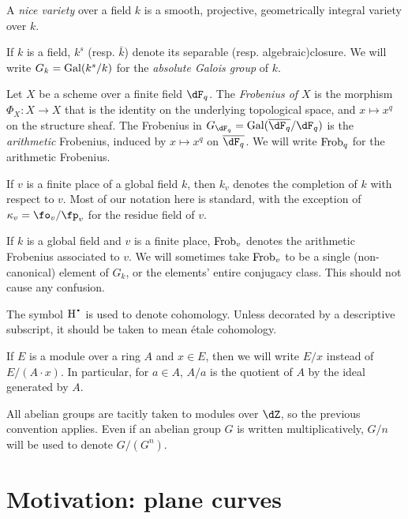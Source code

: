 \documentclass{article}
\begin{document}
A \emph{nice variety} over a field $k$ is a smooth, projective, geometrically 
integral variety over $k$. 

If $k$ is a field, $k^s$ (resp. $\bar k$) denote its separable (resp. 
algebraic)closure. We will write $G_k = \operatorname{Gal}(k^s/k)$ for the \emph{absolute 
Galois group} of $k$. 


Let $X$ be a scheme over a finite field $\dF_q$. The \emph{Frobenius of $X$} 
is the morphism $\Phi_X:X\to X$ that is the identity on the underlying 
topological space, and $x\mapsto x^q$ on the structure sheaf. The Frobenius in 
$G_{\dF_q} = \gal(\overline{\dF_q}/\dF_q)$ is the \emph{arithmetic} Frobenius, 
induced by $x\mapsto x^q$ on $\overline{\dF_q}$. We will write $\mathrm{Frob}_q$ for 
the arithmetic Frobenius. 

If $v$ is a finite place of a global field $k$, then $k_v$ denotes the 
completion of $k$ with respect to $v$. Most of our notation here is standard, 
with the exception of $\kappa_v=\fo_v/\fp_v$ for the residue field of $v$. 

If $k$ is a global field and $v$ is a finite place, $\mathrm{Frob}_v$ denotes the 
arithmetic Frobenius associated to $v$. We will sometimes take $\mathrm{Frob}_v$ to be 
a single (non-canonical) element of $G_k$, or the elements' entire conjugacy 
class. This should not cause any confusion. 

The symbol $\h^\bullet{}$ is used to denote cohomology. Unless decorated by a 
descriptive subscript, it should be taken to mean \'etale cohomology. 

If $E$ is a module over a ring $A$ and $x\in E$, then we will write $E/x$ 
instead of $E/(A\cdot x)$. In particular, for $a\in A$, $A/a$ is the quotient 
of $A$ by the ideal generated by $A$. 

All abelian groups are tacitly taken to modules over $\dZ$, so the previous 
convention applies. Even if an abelian group $G$ is written multiplicatively, 
$G/n$ will be used to denote $G/(G^n)$. 










\section*{Motivation: plane curves}
\end{document}
